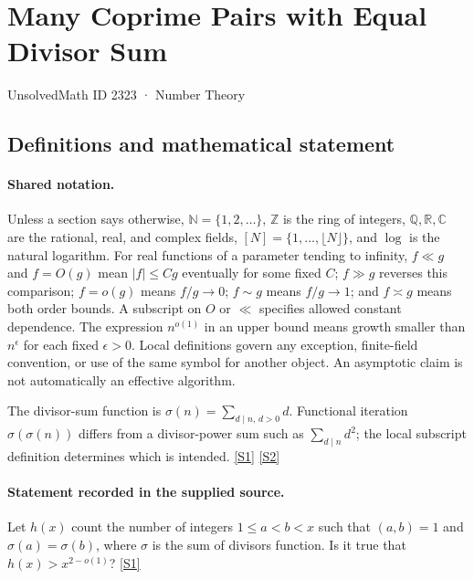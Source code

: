 \documentclass[11pt,a4paper]{article}
\newcommand{\N}{\mathbb{N}}
\newcommand{\Z}{\mathbb{Z}}
\newcommand{\Q}{\mathbb{Q}}
\newcommand{\R}{\mathbb{R}}
\newcommand{\C}{\mathbb{C}}
\newcommand{\sref}[2]{\hyperlink{source:#1:#2}{[S#2]}}
\begin{document}

\setcounter{section}{2322}

\section{Many Coprime Pairs with Equal Divisor Sum}\label{2323}

{\small\sffamily UnsolvedMath ID 2323 · Number Theory}

\subsection{Definitions and mathematical statement}

\paragraph{Shared notation.}Unless a section says otherwise, $\N=\{1,2,\ldots\}$,
$\Z$ is the ring of integers, $\Q,\R,\C$ are the rational, real, and complex
fields, $[N]=\{1,\ldots,\lfloor N\rfloor\}$, and $\log$ is the natural
logarithm. For real functions of a parameter tending to infinity,
$f\ll g$ and $f=O(g)$ mean $|f|\leq Cg$ eventually for some fixed $C$;
$f\gg g$ reverses this comparison; $f=o(g)$ means $f/g\to0$;
$f\sim g$ means $f/g\to1$; and $f\asymp g$ means both order bounds.
A subscript on $O$ or $\ll$ specifies allowed constant dependence.
The expression $n^{o(1)}$ in an upper bound means growth smaller than
$n^\epsilon$ for each fixed $\epsilon>0$. Local definitions govern any
exception, finite-field convention, or use of the same symbol for another
object. An asymptotic claim is not automatically an effective algorithm.



The divisor-sum function is $\sigma(n)=\sum_{d\mid n,\,d>0}d$. Functional iteration $\sigma(\sigma(n))$ differs from a divisor-power sum such as $\sum_{d\mid n}d^2$; the local subscript definition determines which is intended. \sref{2323}{1} \sref{2323}{2}

\paragraph{Statement recorded in the supplied source.}
Let $h(x)$ count the number of integers $1\leq a<b<x$ such that $(a,b)=1$ and $\sigma(a)=\sigma(b)$, where $\sigma$ is the sum of divisors function.
Is it true that $h(x)>x^{2-o(1)}$? \sref{2323}{1}
\end{document}
